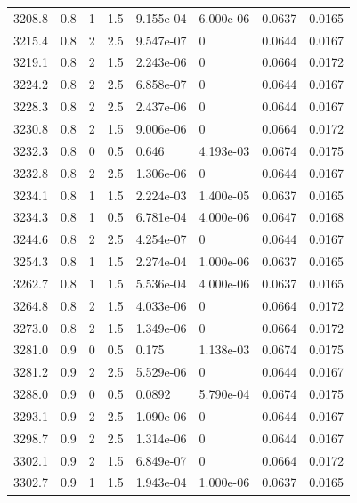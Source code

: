 \documentclass[preview]{standalone}
\begin{document}
{{{{{{{{{{{\begin{tabular}{L{1.2cm}C{1.2cm} C{0.3cm}C{0.5cm} C{1.4cm}C{1.4cm} C{1.4cm}C{1.4cm}}
  3208.8  &   0.8  & 1     & 1.5 &  9.155e-04  & 6.000e-06  & 0.0637 &  0.0165   \\ 
  3215.4  &   0.8  & 2     & 2.5 &  9.547e-07  & 0  & 0.0644 &  0.0167   \\ 
  3219.1  &   0.8  & 2     & 1.5 &  2.243e-06  & 0  & 0.0664 &  0.0172   \\ 
  3224.2  &   0.8  & 2     & 2.5 &  6.858e-07  & 0  & 0.0644 &  0.0167   \\ 
  3228.3  &   0.8  & 2     & 2.5 &  2.437e-06  & 0  & 0.0644 &  0.0167   \\ 
  3230.8  &   0.8  & 2     & 1.5 &  9.006e-06  & 0  & 0.0664 &  0.0172   \\ 
  3232.3  &   0.8  & 0     & 0.5 &  0.646  & 4.193e-03  & 0.0674 &  0.0175   \\ 
  3232.8  &   0.8  & 2     & 2.5 &  1.306e-06  & 0  & 0.0644 &  0.0167   \\ 
  3234.1  &   0.8  & 1     & 1.5 &  2.224e-03  & 1.400e-05  & 0.0637 &  0.0165   \\ 
  3234.3  &   0.8  & 1     & 0.5 &  6.781e-04  & 4.000e-06  & 0.0647 &  0.0168   \\ 
  3244.6  &   0.8  & 2     & 2.5 &  4.254e-07  & 0  & 0.0644 &  0.0167   \\ 
  3254.3  &   0.8  & 1     & 1.5 &  2.274e-04  & 1.000e-06  & 0.0637 &  0.0165   \\ 
  3262.7  &   0.8  & 1     & 1.5 &  5.536e-04  & 4.000e-06  & 0.0637 &  0.0165   \\ 
  3264.8  &   0.8  & 2     & 1.5 &  4.033e-06  & 0  & 0.0664 &  0.0172   \\ 
  3273.0  &   0.8  & 2     & 1.5 &  1.349e-06  & 0  & 0.0664 &  0.0172   \\ 
  3281.0  &   0.9  & 0     & 0.5 &  0.175  & 1.138e-03  & 0.0674 &  0.0175   \\ 
  3281.2  &   0.9  & 2     & 2.5 &  5.529e-06  & 0  & 0.0644 &  0.0167   \\ 
  3288.0  &   0.9  & 0     & 0.5 &  0.0892  & 5.790e-04  & 0.0674 &  0.0175   \\ 
  3293.1  &   0.9  & 2     & 2.5 &  1.090e-06  & 0  & 0.0644 &  0.0167   \\ 
  3298.7  &   0.9  & 2     & 2.5 &  1.314e-06  & 0  & 0.0644 &  0.0167   \\ 
  3302.1  &   0.9  & 2     & 1.5 &  6.849e-07  & 0  & 0.0664 &  0.0172   \\ 
  3302.7  &   0.9  & 1     & 1.5 &  1.943e-04  & 1.000e-06  & 0.0637 &  0.0165   \\ 

\end{tabular}}}}}}}}}}}}
\end{document}
